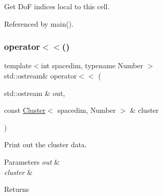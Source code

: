 Get DoF indices local to this cell.

Referenced by main().

\mbox{\label{group__hierarchical__matrices_ga79f6d9af30209ae20bdf81906360664a}} 
\subsubsection{\texorpdfstring{operator$<$$<$()}{operator<<()}}
{\footnotesize\ttfamily template$<$int spacedim, typename Number $>$ \\
std\+::ostream\& operator$<$$<$ (\begin{DoxyParamCaption}\item[{std\+::ostream \&}]{out,  }\item[{const \hyperlink{classCluster}{Cluster}$<$ spacedim, Number $>$ \&}]{cluster }\end{DoxyParamCaption})}

Print out the cluster data. 
\begin{DoxyParams}{Parameters}
{\em out} & \\
\hline
{\em cluster} & \\
\hline
\end{DoxyParams}
\begin{DoxyReturn}{Returns}

\end{DoxyReturn}
